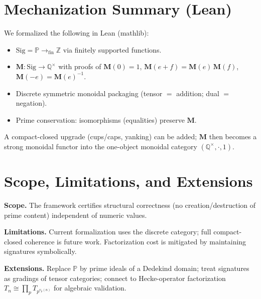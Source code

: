 \documentclass[11pt]{article}
\theoremstyle{plain}
\theoremstyle{definition}
\newcommand{\Z}{\mathbb{Z}}
\newcommand{\Q}{\mathbb{Q}}
\newcommand{\PP}{\mathbb{P}} %
\newcommand{\Sig}{\mathrm{Sig}}
\newcommand{\M}{\mathbf{M}} %
\begin{document}
\section{Mechanization Summary (Lean)}
\label{sec:lean}
We formalized the following in Lean (mathlib):
\begin{itemize}[leftmargin=*]
  \item $\Sig=\PP\to_{\mathrm{fin}}\Z$ via finitely supported functions.
  \item $\M:\Sig\to\Q^{\times}$ with proofs of $\M(0)=1$, $\M(e+f)=\M(e)\,\M(f)$, $\M(-e)=\M(e)^{-1}$.
  \item Discrete symmetric monoidal packaging (tensor $=$ addition; dual $=$ negation).
  \item Prime conservation: isomorphisms (equalities) preserve $\M$.
\end{itemize}
A compact-closed upgrade (cups/caps, yanking) can be added; $\M$ then becomes a strong monoidal functor into the one-object monoidal category $(\Q^{\times},\cdot,1)$.

\section{Scope, Limitations, and Extensions}
\label{sec:extensions}
\textbf{Scope.} The framework certifies structural correctness (no creation/destruction of prime content) independent of numeric values.

\textbf{Limitations.} Current formalization uses the discrete category; full compact-closed coherence is future work. Factorization cost is mitigated by maintaining signatures symbolically.

\textbf{Extensions.} Replace $\PP$ by prime ideals of a Dedekind domain; treat signatures as gradings of tensor categories; connect to Hecke-operator factorization $T_n\cong\prod_p T_{p^{v_p(n)}}$ for algebraic validation.

\appendix
\end{document}
